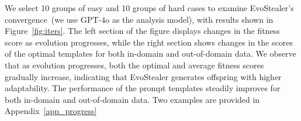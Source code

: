 We select 10 groups of easy and 10 groups of hard cases to examine EvoStealer's convergence~(we use GPT-4o as the analysis model), with results shown in Figure~\ref{fig:iters}. The left section of the figure displays changes in the fitness score as evolution progresses, while the right section shows changes in the scores of the optimal templates for both in-domain and out-of-domain data. We observe that as evolution progresses, both the optimal and average fitness scores gradually increase, indicating that EvoStealer generates offspring with higher adaptability. The performance of the prompt templates steadily improves for both in-domain and out-of-domain data. Two examples are provided in Appendix~\ref{app_progress}



